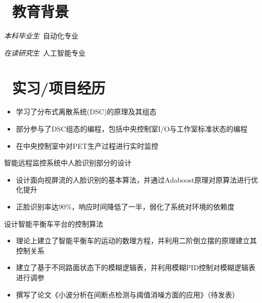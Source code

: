 \documentclass{resume}
\begin{document}



\section{\faGraduationCap\  教育背景}
\textit{本科毕业生}\ 自动化专业

\textit{在读研究生}\ 人工智能专业

\section{\faUsers\ 实习/项目经历}
\role{技术助理}{实习}
\begin{itemize}
  \item 学习了分布式离散系统(DSC)的原理及其组态
  \item 部分参与了DSC组态的编程，包括中央控制室I/O与工作室标准状态的编程
  \item 在中央控制室中对PET生产过程进行实时监控
\end{itemize}

\begin{onehalfspacing}
智能远程监控系统中人脸识别部分的设计
\begin{itemize}
  \item 设计面向视屏流的人脸识别的基本算法，并通过Adaboost原理对原算法进行优化提升
  \item 正脸识别率达90\%，响应时间降低了一半，弱化了系统对环境的依赖度

\end{itemize}
\end{onehalfspacing}

\begin{onehalfspacing}
设计智能平衡车平台的控制算法
\begin{itemize}
  \item 理论上建立了智能平衡车的运动的数理方程，并利用二阶倒立摆的原理建立其控制关系
  \item 建立了基于不同路面状态下的模糊逻辑表，并利用模糊PID控制对模糊逻辑表进行调参
  \item 撰写了论文《小波分析在间断点检测与阈值消噪方面的应用》（待发表）
\end{itemize}
\end{onehalfspacing}
\end{document}
